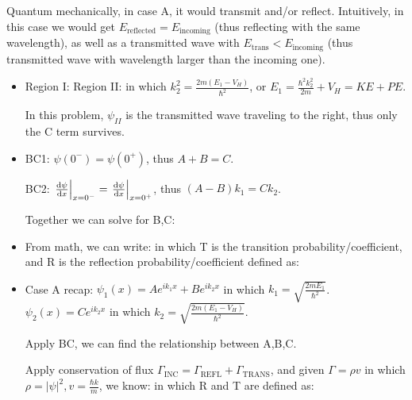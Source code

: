 \documentclass{school-22.101-notes}
\begin{document}
Quantum mechanically, in case A, it would transmit and/or reflect. Intuitively, in this case we would get $E_{\mathrm{reflected}} = E_{\mathrm{incoming}}$ (thus reflecting with the same wavelength), as well as a transmitted wave with $E_{\mathrm{trans}} < E_{\mathrm{incoming}}$ (thus transmitted wave with wavelength larger than the incoming one). 

\begin{itemize}
\item

Region I: 
Region II:
in which $k_2^2 = \frac{2m (E_1 - V_H)}{\hbar^2}$, or $E_1  = \frac{\hbar^2 k_2^2}{2m} + V_H = KE + PE$. 

In this problem, $\psi_{II}$ is the transmitted wave traveling to the right, thus only the C term survives. 

\item 
BC1: $\psi(0^-) = \psi(0^+)$, thus $A+B = C$. 

BC2: $\left. \frac{\mathrm{d}\psi}{\mathrm{d}x} \right|_{x=0^-} = \left. \frac{\mathrm{d}\psi}{\mathrm{d}x} \right|_{x=0^+}$, thus $(A - B) k_1 = C k_2$. 

Together we can solve for B,C:

\item 
From math, we can write: 
in which T is the transition probability/coefficient, and R is the reflection probability/coefficient defined as:

\item Case A recap: 
$\psi_1 (x) = A e^{ik_1 x} + B e^{i k_2 x}$ in which $k_1 = \sqrt{\frac{2 m E_1}{\hbar^2}}$. \\
$\psi_2 (x) = C e^{ik_2 x}$ in which $k_2 = \sqrt{\frac{2 m (E_1 - V_H)}{\hbar^2}}$. 

Apply BC, we can find the relationship between A,B,C. 

Apply conservation of flux $\Gamma_{\mbox{INC}} = \Gamma_{\mbox{REFL}} + \Gamma_{\mbox{TRANS}}$, and given $\Gamma = \rho v$ in which $\rho = |\psi|^2, v = \frac{\hbar k}{m}$, we know: 
in which R and T are defined as:
\end{itemize}
\end{document}
